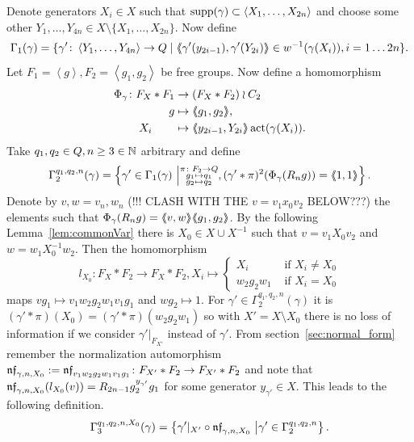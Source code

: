 \documentclass[a4paper,11pt]{amsart}
\begin{document}
 Denote generators $X_i\in X$ such that $\operatorname{{supp}}(\gamma) \subset \left<X_1,\ldots,X_{2n}\right>$ and choose some 
 other $Y_1,\ldots,Y_{4n} \in X \setminus \{X_1,\ldots,X_{2n}\}$. 
 Now define
 \[\Gamma_1(\gamma) = \{\gamma' \colon \left< Y_1,\ldots ,Y_{4n}\right> \to Q \mid \langle\negthickspace\langle\gamma'(y_{2i-1}),\gamma'(Y_{2i})\rangle\negthickspace\rangle\in w^{-1}(\gamma(X_i)),i=1\ldots2n\}.\] 
 Let $F_1=\left<g\right>,F_2=\left<g_1,g_2\right>$ be free groups. 
 Now define a homomorphism  
 \begin{align*}
  \Phi_{\gamma}\colon F_X*F_1 &\to (F_X*F_2)\wr C_2 \\ g&\mapsto \langle\negthickspace\langle g_1,g_2\rangle\negthickspace\rangle,\\ X_i\qquad &\mapsto \langle\negthickspace\langle y_{2i-1},Y_{2i}\rangle\negthickspace\rangle\operatorname{act}(\gamma(X_i)).
 \end{align*}
Take $q_1,q_2 \in Q,n\geq3\in \mathbb{N}$ arbitrary and define
 \[\Gamma_2^{q_1,q_2,n}(\gamma) = \left\{\gamma'\in \Gamma_1(\gamma) \ \middle \vert \substack{\pi\colon F_2\to Q\\
										g_1\mapsto q_1 \\
										g_2\mapsto q_2 }, (\gamma'*\pi)^2(\Phi_\gamma(R_ng))=\langle\negthickspace\langle1,1\rangle\negthickspace\rangle\right\}.\] 
 Denote by $v,w=v_n,w_n$ (!!! CLASH WITH THE $v=v_1x_0v_2$ BELOW???) the elements such that $\Phi_\gamma(R_ng)=\langle\negthickspace\langle v,w\rangle\negthickspace\rangle\langle\negthickspace\langle g_1,g_2\rangle\negthickspace\rangle$. By the following Lemma~\ref{lem:commonVar} there is 
 $X_0 \in X\cup X^{-1}$ such that $v=v_1X_0v_2$ and $w=w_1X_0^{-1}w_2$. Then the homomorphism
 \[l_{X_0}\colon F_X*F_2\to F_X*F_2, X_i \mapsto \begin{cases}
						X_i &\text{ if } X_i\neq {X_0} \\
						w_2g_2w_1 &\text{ if }X_i= {X_0} 
                                             \end{cases}\]
 maps $vg_1 \mapsto v_1w_2g_2w_1v_1g_1$ and $wg_2\mapsto 1$. 
 For $\gamma'\in \Gamma_2^{q_1,q_2,n}(\gamma)$ it is $(\gamma'*\pi)(X_0)=({\gamma'*\pi})(w_2g_2w_1)$ so with $X'=X\setminus X_0$ there is no loss of information if 
 we consider $\gamma'|_{F_{X'}}$ instead of $\gamma'$.
 From section~\ref{sec:normal_form} remember the normalization 
 automorphism $\mathfrak{nf}_{\gamma,n,X_0}:=\mathfrak{nf}_{v_1w_2g_2w_1v_1g_1}\colon F_{X'}*F_2 \to F_{X'}*F_2$
  and note that
 $\mathfrak{nf}_{\gamma,n,X_0}(l_{X_0}(v))=R_{2n-1}g_2^{{y_{\gamma'}}}g_1$ for some generator ${y_{\gamma'}}\in X$.
 This leads to the following definition.
 \[\Gamma_3^{q_1,q_2,n,X_0}(\gamma) = \left\{\gamma'|_{X'} \circ \mathfrak{nf}_{\gamma,n,X_0} \ \middle \vert \gamma' \in \Gamma_2^{q_1,q_2,n} \right\}.\] 
\end{document}

